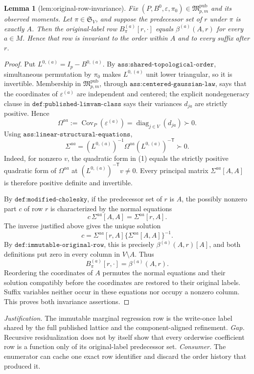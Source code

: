 \documentclass{article}
\newtheorem{lemma}{Lemma}
\begin{document}
\begin{lemma}[lem:original-row-invariance]\label{lem:original-row-invariance}
Fix \((P,B^0,\varepsilon,\pi_0)\in\mathfrak M_{p,m}^{\mathrm{pub}}\) and its observed moments. Let \(\pi\in\mathfrak S_V\), and suppose the predecessor set of \(r\) under \(\pi\) is exactly \(A\). Then the original-label row \(B_\pi^{(a)}[r,\cdot]\) equals \(\beta^{(a)}(A,r)\) for every \(a\in M\). Hence that row is invariant to the order within \(A\) and to every suffix after \(r\).
\end{lemma}
\begin{proof}
Put \(L^{0,(a)}=I_p-B^{0,(a)}\). By
\(\texttt{ass:shared-topological-order}\), simultaneous permutation by
\(\pi_0\) makes \(L^{0,(a)}\) unit lower triangular, so it is invertible.
Membership in \(\mathfrak M_{p,m}^{\mathrm{pub}}\), through
\(\texttt{ass:centered-gaussian-law}\), says that the coordinates of
\(\varepsilon^{(a)}\) are independent and centered; the explicit
nondegeneracy clause in \(\texttt{def:published-limvam-class}\) says their
variances \(d_{ja}\) are strictly positive. Hence
\[
 \Omega^{aa}:=\operatorname{Cov}_P(\varepsilon^{(a)})
 =\operatorname{diag}_{j\in V}(d_{ja})\succ0.
\]
Using \(\texttt{ass:linear-structural-equations}\),
\[
 \Sigma^{aa}=(L^{0,(a)})^{-1}\Omega^{aa}(L^{0,(a)})^{-\mathsf T}\succ0.
 \tag{1}
\]
Indeed, for nonzero \(v\), the quadratic form in (1) equals the strictly
positive quadratic form of \(\Omega^{aa}\) at
\((L^{0,(a)})^{-\mathsf T}v\ne0\). Every principal matrix
\(\Sigma^{aa}[A,A]\) is therefore positive definite and invertible.

By \(\texttt{def:modified-cholesky}\), if the predecessor set of \(r\) is
\(A\), the possibly nonzero part \(c\) of row \(r\) is characterized by the
normal equations
\[
 c\,\Sigma^{aa}[A,A]=\Sigma^{aa}[r,A].
\]
The inverse justified above gives the unique solution
\[
 c=\Sigma^{aa}[r,A]\{\Sigma^{aa}[A,A]\}^{-1}.
\]
By \(\texttt{def:immutable-original-row}\), this is precisely
\(\beta^{(a)}(A,r)[A]\), and both definitions put zero in every column in
\(V\setminus A\). Thus
\[
 B_\pi^{(a)}[r,\cdot]=\beta^{(a)}(A,r).
\]
Reordering the coordinates of \(A\) permutes the normal equations and their
solution compatibly before the coordinates are restored to their original
labels. Suffix variables neither occur in these equations nor occupy a
nonzero column. This proves both invariance assertions.
\end{proof}
\par\smallskip\noindent \textit{Justification.} The immutable marginal regression row is the write-once label shared by the full published lattice and the component-aligned refinement. \textit{Gap.} Recursive residualization does not by itself show that every orderwise coefficient row is a function only of its original-label predecessor set. \textit{Consumer.} The enumerator can cache one exact row identifier and discard the order history that produced it.
\end{document}

